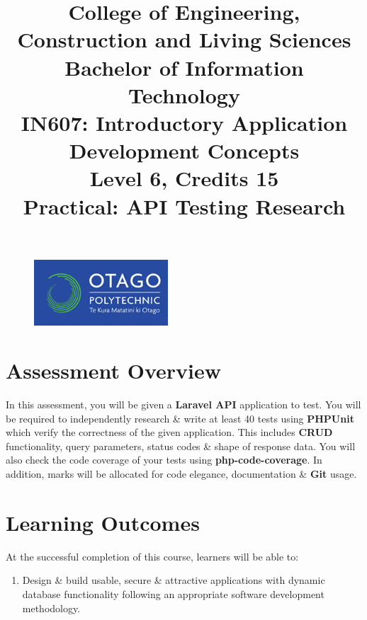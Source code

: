 \documentclass{article}
\author{}
\begin{document}
\begin{figure}
	\centering
	\includegraphics[width=50mm]{../img/logo.png}
\end{figure}

\title{College of Engineering, Construction and Living Sciences\\Bachelor of Information Technology\\IN607: Introductory Application Development Concepts\\Level 6, Credits 15\\\textbf{Practical: API Testing Research}}
\date{}
\maketitle

\section*{Assessment Overview}
In this assessment, you will be given a \textbf{Laravel API} application to test. You will be required to independently research \& write at least 40 tests using \textbf{PHPUnit} which verify the correctness of the given application. This includes \textbf{CRUD} functionality, query parameters, status codes \& shape of response data. You will also check the code coverage of your tests using \textbf{php-code-coverage}. In addition, marks will be allocated for code elegance, documentation \& \textbf{Git} usage. 

\section*{Learning Outcomes}
At the successful completion of this course, learners will be able to:
\begin{enumerate}
	\item Design \& build usable, secure \& attractive applications with dynamic database functionality following an appropriate software development methodology.
\end{enumerate}
\end{document}
